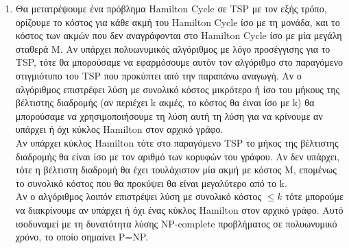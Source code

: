 \documentclass{article}
\begin{document}
\begin{enumerate}
\begin{enumerate}
\end{enumerate}
    \item{}
        Θα μετατρέψουμε ένα πρόβλημα Hamilton Cycle σε TSP με τον εξής τρόπο, ορίζουμε το κόστος για κάθε 
        ακμή του Hamilton Cycle ίσο με τη μονάδα, και το κόστος των ακμών που δεν αναγράφονται στο Hamilton 
        Cycle ίσο με μία μεγάλη σταθερά M. Αν υπάρχει πολυωνυμικός αλγόριθμος με λόγο προσέγγισης για το TSP,
        τότε θα μπορούσαμε να εφαρμόσουμε αυτόν τον αλγόριθμο στο παραγόμενο στιγμιότυπο του TSP που προκύπτει 
        από την παραπάνω αναγωγή. Αν ο αλγόριθμος επιστρέφει λύση με συνολικό κόστος μικρότερο ή ίσο του μήκους
        της βέλτιστης διαδρομής (αν περιέχει k ακμές, το κόστος θα έιναι ίσο με k) θα μπορούσαμε να χρησιμοποιήσουμε τη λύση αυτή
        τη λύση για να κρίνουμε αν υπάρχει ή όχι κύκλος Hamilton στον αρχικό γράφο.\\

        Αν υπάρχει κύκλος Hamilton τότε στο παραγόμενο TSP το μήκος της βέλτιστης διαδρομής θα είναι ίσο
        με τον αριθμό των κορυφών του γράφου. Αν δεν υπάρχει, τότε η βέλτιστη διαδρομή θα έχει τουλάχιστον 
        μία ακμή με κόστος Μ, επομένως το συνολικό κόστος που θα προκύψει θα είναι μεγαλύτερο από το k.\\

        Αν ο αλγόριθμος λοιπόν επιστρέψει λύση με συνολικό κόστος $\le k$ τότε μπορούμε να διακρίνουμε αν
        υπάρχει ή όχι ένας κύκλος Hamilton στον αρχικό γράφο. Αυτό ισοδυναμεί με τη δυνατότητα λύσης NP-complete
        προβλήματος σε πολυωνυμικό χρόνο, το οποίο σημαίνει P=NP.\\
\end{enumerate}

\pagebreak
\printbibliography
\end{document}
